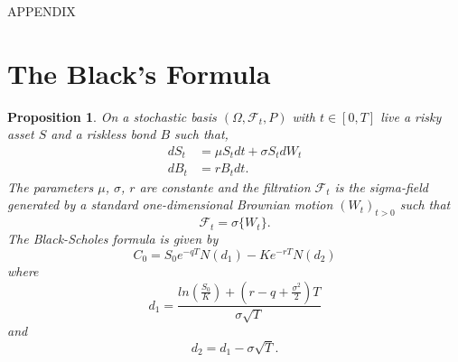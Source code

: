 \documentclass{article}
\newtheorem{prop}[thm]{Proposition}
\theoremstyle{definition}
\theoremstyle{remark}
\newcommand{\filtration}[1]{\ensuremath{\mathscr{F}_{#1}}}
\newcommand{\donebis}{\ensuremath{\frac{ln\left( \frac{S_0}{K}\right)+\left( r-q+\frac{\sigma^2}{2}\right)T}{\sigma\sqrt{T}}}}
\newcommand{\process}[1]{\ensuremath{(#1_t)_{t>0}}}
\begin{document}




\newpage
APPENDIX
\appendix
\section{The Black's Formula}\label{appBlack}

\begin{prop}\label{prop:bs_}
On a stochastic basis $(\Omega, \filtration{t}, P)$ with $t \in [0, T]$ live a risky asset $S$ and a riskless bond $B$ such that,
\begin{subequations}
\begin{align}
dS_t&=\mu S_tdt+\sigma S_tdW_t\label{eq:stockDynBis}\\
dB_t&=rB_tdt\label{eq:bondDynBis}.
\end{align}
\end{subequations}
The parameters $\mu$, $\sigma$, $r$ are constante and the filtration \filtration{t} is the sigma-field generated by a standard one-dimensional Brownian motion \process{W} such that 
\begin{equation*}
\filtration{t}=\sigma\{W_t\}.
\end{equation*}
The \emph{Black-Scholes formula} is given by
\begin{equation}
C_0=S_0e^{-qT}N(d_1)-Ke^{-rT}N(d_2)
\end{equation}
where
\begin{equation}
d_1=\donebis
\end{equation}
and
\begin{equation}
d_2=d_1-\sigma \sqrt{T}.
\end{equation}
\end{prop}
\end{document}
